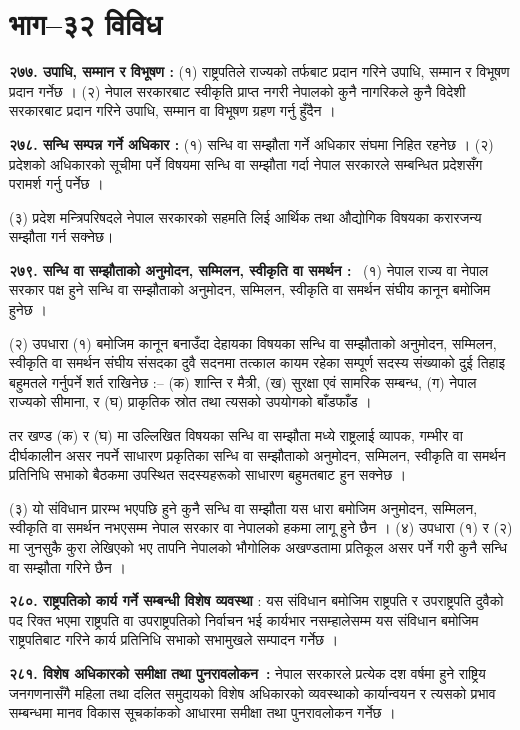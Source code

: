 \section{भाग–३२ विविध}

\textbf{२७७. उपाधि, सम्मान र विभूषण :} (१) राष्ट्रपतिले राज्यको तर्फबाट प्रदान गरिने उपाधि, सम्मान र विभूषण प्रदान गर्नेछ ।
(२) नेपाल सरकारबाट स्वीकृति प्राप्त नगरी नेपालको कुनै नागरिकले कुनै विदेशी सरकारबाट प्रदान गरिने उपाधि, सम्मान वा विभूषण ग्रहण गर्नु हुँदैन ।

\textbf{२७८. सन्धि सम्पन्न गर्ने अधिकार :} (१) सन्धि वा सम्झौता गर्ने अधिकार संघमा निहित रहनेछ ।
(२) प्रदेशको अधिकारको सूचीमा पर्ने विषयमा सन्धि वा सम्झौता गर्दा नेपाल सरकारले सम्बन्धित प्रदेशसँग परामर्श गर्नु पर्नेछ ।

(३) प्रदेश मन्त्रिपरिषदले नेपाल सरकारको सहमति लिई आर्थिक तथा औद्योगिक विषयका करारजन्य सम्झौता गर्न सक्नेछ।

\textbf{२७९. सन्धि वा सम्झौताको अनुमोदन, सम्मिलन, स्वीकृति वा समर्थन :}  (१) नेपाल राज्य वा नेपाल सरकार पक्ष हुने सन्धि वा सम्झौताको अनुमोदन, सम्मिलन, स्वीकृति वा समर्थन संघीय कानून बमोजिम हुनेछ ।

(२) उपधारा (१) बमोजिम कानून बनाउँदा देहायका विषयका सन्धि वा सम्झौताको अनुमोदन, सम्मिलन, स्वीकृति वा समर्थन संघीय संसदका दुवै सदनमा तत्काल कायम रहेका सम्पूर्ण सदस्य संख्याको दुई तिहाइ बहुमतले गर्नुपर्ने शर्त राखिनेछ :–
(क) शान्ति र मैत्री,
(ख) सुरक्षा एवं सामरिक सम्बन्ध,
(ग) नेपाल राज्यको सीमाना, र
(घ) प्राकृतिक स्रोत तथा त्यसको उपयोगको बाँडफाँड ।

तर खण्ड (क) र (घ) मा उल्लिखित विषयका सन्धि वा सम्झौता मध्ये राष्ट्रलाई व्यापक, गम्भीर वा दीर्घकालीन असर नपर्ने साधारण प्रकृतिका सन्धि वा सम्झौताको अनुमोदन, सम्मिलन, स्वीकृति वा समर्थन प्रतिनिधि सभाको बैठकमा उपस्थित सदस्यहरूको साधारण बहुमतबाट हुन सक्नेछ ।

(३) यो संविधान प्रारम्भ भएपछि हुने कुनै सन्धि वा सम्झौता यस धारा बमोजिम अनुमोदन, सम्मिलन, स्वीकृति वा समर्थन नभएसम्म नेपाल सरकार वा नेपालको हकमा लागू हुने छैन ।
(४) उपधारा (१) र (२) मा जुनसुकै कुरा लेखिएको भए तापनि नेपालको भौगोलिक अखण्डतामा प्रतिकूल असर पर्ने गरी कुनै सन्धि वा सम्झौता गरिने छैन ।

\textbf{२८०. राष्ट्रपतिको कार्य गर्ने सम्बन्धी विशेष व्यवस्था }: यस संविधान बमोजिम राष्ट्रपति र उपराष्ट्रपति दुवैको पद रिक्त भएमा राष्ट्रपति वा उपराष्ट्रपतिको निर्वाचन भई कार्यभार नसम्हालेसम्म यस संविधान बमोजिम राष्ट्रपतिबाट गरिने कार्य प्रतिनिधि सभाको सभामुखले सम्पादन गर्नेछ ।

\textbf{२८१. विशेष अधिकारको समीक्षा तथा पुनरावलोकन :} नेपाल सरकारले प्रत्येक दश वर्षमा हुने राष्ट्रिय जनगणनासँगै महिला तथा दलित समुदायको विशेष अधिकारको व्यवस्थाको कार्यान्वयन र त्यसको प्रभाव सम्बन्धमा मानव विकास सूचकांकको आधारमा समीक्षा तथा पुनरावलोकन गर्नेछ ।

